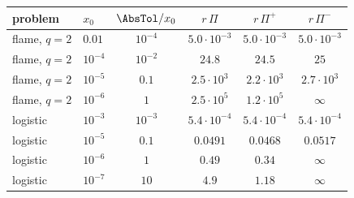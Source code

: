 \begin{tabular}{llcccc}
\toprule
problem & $x_0$ & $\AbsTol/x_0$ & $r\,\Pi$ & $r\,\Pi^{+}$ & $r\,\Pi^{-}$\\
\midrule
flame, $q=2$ & $0.01$ & $10^{-4}$ & $5.0\cdot10^{-3}$ & $5.0\cdot10^{-3}$ & $5.0\cdot10^{-3}$\\
flame, $q=2$ & $10^{-4}$ & $10^{-2}$ & $24.8$ & $24.5$ & $25$\\
flame, $q=2$ & $10^{-5}$ & $0.1$ & $2.5\cdot10^{3}$ & $2.2\cdot10^{3}$ & $2.7\cdot10^{3}$\\
flame, $q=2$ & $10^{-6}$ & $1$ & $2.5\cdot10^{5}$ & $1.2\cdot10^{5}$ & $\infty$\\
logistic & $10^{-3}$ & $10^{-3}$ & $5.4\cdot10^{-4}$ & $5.4\cdot10^{-4}$ & $5.4\cdot10^{-4}$\\
logistic & $10^{-5}$ & $0.1$ & $0.0491$ & $0.0468$ & $0.0517$\\
logistic & $10^{-6}$ & $1$ & $0.49$ & $0.34$ & $\infty$\\
logistic & $10^{-7}$ & $10$ & $4.9$ & $1.18$ & $\infty$\\
\bottomrule
\end{tabular}
